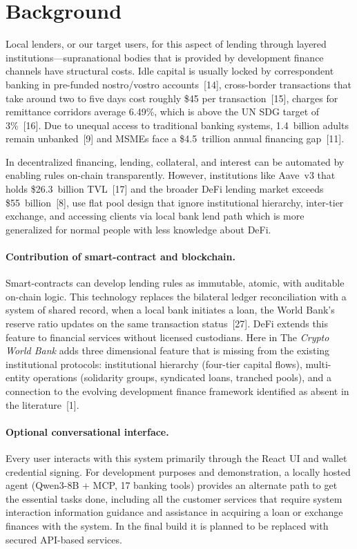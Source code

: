 \documentclass[12pt, a4paper]{report}
\begin{document}
\section{Background}
\label{sec:background}

Local lenders, or our target users, for this aspect of lending through layered institutions---supranational bodies that is provided by development finance channels have structural costs. Idle capital is usually locked by correspondent banking in pre-funded nostro/vostro accounts~[14], cross-border transactions that take around two to five days cost roughly \$45 per transaction~[15], charges for remittance corridors average 6.49\%, which is above the UN SDG target of 3\%~[16]. Due to unequal access to traditional banking systems, 1.4~billion adults remain unbanked~[9] and MSMEs face a \$4.5~trillion annual financing gap~[11].

In decentralized financing, lending, collateral, and interest can be automated by enabling rules on-chain transparently. However, institutions like Aave~v3 that holds \$26.3~billion TVL~[17] and the broader DeFi lending market exceeds \$55~billion~[8], use flat pool design that ignore institutional hierarchy, inter-tier exchange, and accessing clients via local bank lend path which is more generalized for normal people with less knowledge about DeFi.

\paragraph{Contribution of smart-contract and blockchain.}
Smart-contracts can develop lending rules as immutable, atomic, with auditable on-chain logic. This technology replaces the bilateral ledger reconciliation with a system of shared record, when a local bank initiates a loan, the World Bank's reserve ratio updates on the same transaction status~[27]. DeFi extends this feature to financial services without licensed custodians. Here in The \textit{Crypto World Bank} adds three dimensional feature that is missing from the existing institutional protocols: institutional hierarchy (four-tier capital flows), multi-entity operations (solidarity groups, syndicated loans, tranched pools), and a connection to the evolving development finance framework identified as absent in the literature~[1].

\paragraph{Optional conversational interface.}
Every user interacts with this system primarily through the React UI and wallet credential signing. For development purposes and demonstration, a locally hosted agent (Qwen3-8B + MCP, 17 banking tools) provides an alternate path to get the essential tasks done, including all the customer services that require system interaction information guidance and assistance in acquiring a loan or exchange finances with the system. In the final build it is planned to be replaced with secured API-based services.
\end{document}

